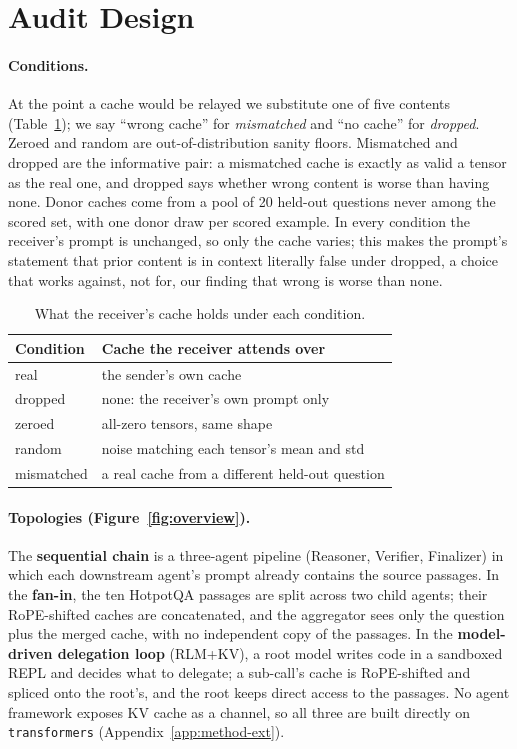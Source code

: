\documentclass[11pt]{article}
\begin{document}
\section{Audit Design}
\label{sec:method}

\paragraph{Conditions.} At the point a cache would be relayed we
substitute one of five contents (Table~\ref{tab:conditions}); we say ``wrong
cache'' for \emph{mismatched} and ``no cache'' for \emph{dropped}. Zeroed and
random are out-of-distribution sanity floors. Mismatched and dropped are the
informative pair: a mismatched cache is exactly as valid a tensor as the real
one, and dropped says whether wrong content is worse than having none. Donor caches come from a pool of 20 held-out
questions never among the scored set, with one donor draw per scored
example. In every condition the receiver's prompt is unchanged, so only
the cache varies; this makes the prompt's statement that prior content is
in context literally false under dropped, a choice that works against,
not for, our finding that wrong is worse than none.

\begin{table}[t]
\centering
\small
\caption{What the receiver's cache holds under each condition.}
\label{tab:conditions}
\begin{tabular}{lp{5.2cm}}
\toprule
\textbf{Condition} & \textbf{Cache the receiver attends over} \\
\midrule
real       & the sender's own cache \\
dropped    & none: the receiver's own prompt only \\
zeroed     & all-zero tensors, same shape \\
random     & noise matching each tensor's mean and std \\
mismatched & a real cache from a different held-out question \\
\bottomrule
\end{tabular}
\end{table}

\paragraph{Topologies (Figure~\ref{fig:overview}).} The \textbf{sequential chain} is a three-agent
pipeline (Reasoner, Verifier, Finalizer) in which each downstream agent's
prompt already contains the source passages. In the \textbf{fan-in}, the
ten HotpotQA passages are split across two child agents; their
RoPE-shifted caches are concatenated, and the aggregator sees only the
question plus the merged cache, with no independent copy of the passages.
In the \textbf{model-driven delegation loop} (RLM+KV), a root model writes
code in a sandboxed REPL and decides what to delegate; a sub-call's cache
is RoPE-shifted and spliced onto the root's, and the root keeps direct
access to the passages. No agent framework exposes KV cache as a
channel, so all three are built directly on \texttt{transformers}
\citep{transformers2020} (Appendix~\ref{app:method-ext}).
\end{document}
